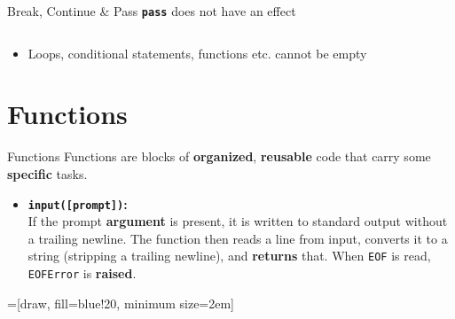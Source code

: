         \begin{frame}{Break, Continue \& Pass}
            \pause
            \LARGE
            \textbf{\texttt{pass}} does not have an effect
            \bigskip  
            \inputminted[frame=single,framesep=2pt]{python3}{../Lecture3/code-examples/pass.py}
            \pause
            \begin{itemize}
                \item Loops, conditional statements, functions etc. cannot be empty 
            \end{itemize}
        \end{frame}


    \section{Functions}
        \begin{frame}{Functions}
            \pause
            \LARGE
            Functions are blocks of \textbf{organized}, \textbf{reusable} code that carry some \textbf{specific} tasks.
            \pause
            \begin{itemize}
                \item \textbf{\texttt{input([prompt])}:} \\
                \pause
                If the prompt \textbf<5->{argument} is present, it is written to standard output without a trailing newline. The function then reads a line from input, converts it to a string (stripping a trailing newline), and \textbf<5->{returns} that. When \texttt{EOF} is read, \texttt{EOFError} is \textbf<5->{raised}.   
            \end{itemize}
            
            \pause
            \pause

            \begin{center}
                =[draw, fill=blue!20, minimum size=2em]

            \end{center}
        \end{frame}   
 
